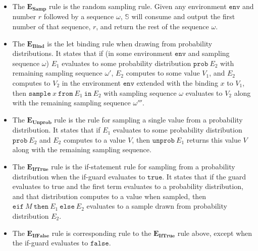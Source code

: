 \documentclass[pageno]{jpaper}
\newcommand{\env}{\mathtt{env}}
\newcommand{\prob}{\mathtt{prob} \ }
\newcommand{\mt}[1]{\mathtt{#1}}
\newcommand{\rulename}[2]{$\boldsymbol{#1}_{\textbf{#2}}$}
\begin{document}
\begin{itemize}
  \item The \rulename{E}{Samp} rule is the random sampling rule. Given any environment $\env$ and number $r$ followed by a sequence $\omega$, $\mathbb{S}$ will consume and output the first number of that sequence, $r$, and return the rest of the sequence $\omega$.
  \item The \rulename{E}{Bind} is the let binding rule when drawing from probability distributions. It states that if (in some environment $\env$ and sampling sequence $\omega$) $E_1$ evaluates to some probability distribution $\mt{prob} \ E_2$ with remaining sampling sequence $\omega'$, $E_2$ computes to some value $V_1$, and $E_2$ computes to $V_2$ in the environment $\env$ extended with the binding $x$ to $V_1$, then $\mt{sample} \ x \ \mt{from} \ E_1 \ \mt{in} \ E_2$ with sampling sequence $\omega$ evaluates to $V_2$ along with the remaining sampling sequence $\omega'''$.
  \item The \rulename{E}{Unprob} rule is the rule for sampling a single value from a probability distribution. It states that if $E_1$ evaluates to some probability distribution $\prob E_2$ and $E_2$ computes to a value $V$, then $\mt{unprob} \ E_1$ returns this value $V$ along with the remaining sampling sequence.
  \item The \rulename{E}{IfTrue} rule is the if-statement rule for sampling from a probability distribution when the if-guard evaluates to $\mt{true}$. It states that if the guard evaluates to true and the first term evaluates to a probability distribution, and that distribution computes to a value when sampled, then $\mt{eif} \ M \ \mt{then} \ E_1 \ \mt{else} \ E_2$ evaluates to a sample drawn from probability distribution $E_2$.
  \item The \rulename{E}{IfFalse} rule is corresponding rule to the \rulename{E}{IfTrue} rule above, except when the if-guard evaluates to $\mt{false}$.
\end{itemize}
\end{document}
